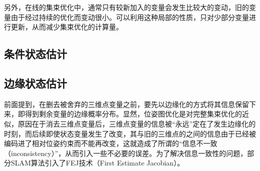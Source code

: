 另外，在线的集束优化中，通常只有较新加入的变量会发生比较大的变动，旧的变量由于经过持续的优化而变动很小。可以利用这种局部的性质，只对少部分变量进行更新，从而减少集束优化的计算量。

\subsection{条件状态估计}

\subsection{边缘状态估计}

前面提到，在删去被舍弃的三维点变量之前，要先以边缘化的方式将其信息保留下来，即得到剩余变量的边缘概率分布。显然，位姿图优化是对完整集束优化的近似，原因在于消去三维点变量后，三维点变量的信息被“永远”定在了发生边缘化的时刻，而后续即使状态变量发生了改变，其与旧的三维点的之间的信息由于已经被编码进了相对位姿约束而不能再改变，这就造成了所谓的“信息不一致（inconsistency）”，从而引入一些不必要的误差。为了解决信息一致性的问题，部分SLAM算法引入了FEJ技术（First Estimate Jacobian）\citep{huang2008analysis,li2012improving}。
